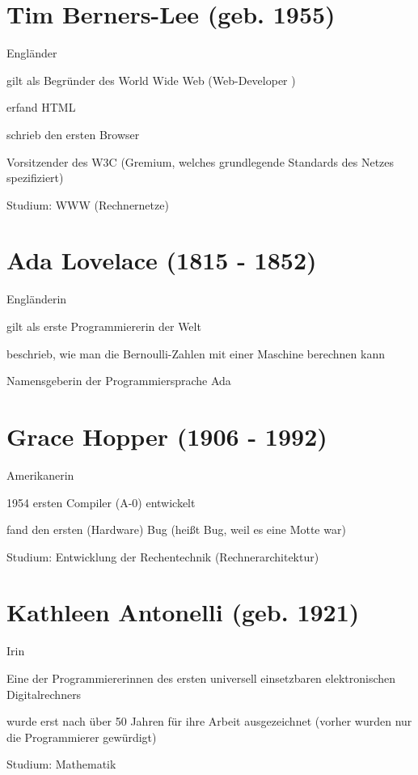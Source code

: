 \documentclass[a4paper,12pt]{scrreprt}
\begin{document}
\section*{Tim Berners-Lee (geb. 1955)}
\begin{itemize*}
    \item Engländer
    \item gilt als Begründer des World Wide Web (Web-Developer \Laughey)
    \item erfand HTML
    \item schrieb den ersten Browser
    \item Vorsitzender des W3C (Gremium, welches grundlegende Standards des Netzes
          spezifiziert)
    \item Studium: WWW (Rechnernetze)
\end{itemize*}

\newpage

\section*{Ada Lovelace (1815 - 1852)}
\begin{itemize*}
    \item Engländerin
    \item gilt als erste Programmiererin der Welt
    \item beschrieb, wie man die Bernoulli-Zahlen mit einer Maschine berechnen kann
    \item Namensgeberin der Programmiersprache Ada
\end{itemize*}

\section*{Grace Hopper (1906 - 1992)}
\begin{itemize*}
    \item Amerikanerin
    \item 1954 ersten Compiler (A-0) entwickelt
    \item fand den ersten (Hardware) Bug (heißt Bug, weil es eine Motte war)
    \item Studium: Entwicklung der Rechentechnik (Rechnerarchitektur)
\end{itemize*}


\section*{Kathleen Antonelli (geb. 1921)}
\begin{itemize*}
    \item Irin
    \item Eine der Programmiererinnen des ersten universell einsetzbaren elektronischen Digitalrechners
    \item wurde erst nach über 50 Jahren für ihre Arbeit ausgezeichnet (vorher wurden nur die Programmierer gewürdigt)
    \item Studium: Mathematik
\end{itemize*}
\end{document}
